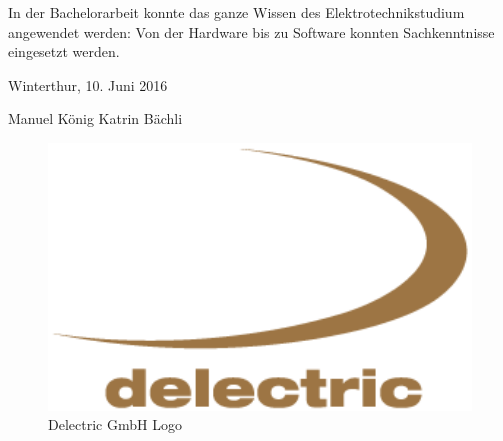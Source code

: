 In der Bachelorarbeit konnte das ganze Wissen des Elektrotechnikstudium angewendet werden: Von der Hardware bis zu Software konnten Sachkenntnisse eingesetzt werden.


Winterthur, 10. Juni 2016


Manuel König
Katrin Bächli


\begin{figure}[ht]
   \includegraphics[width=1\textwidth]{imag_vorwort/delectric_logo_gross.gif}
   \caption{Delectric GmbH Logo}
   \label{delectric_logo} 
\end{figure}




